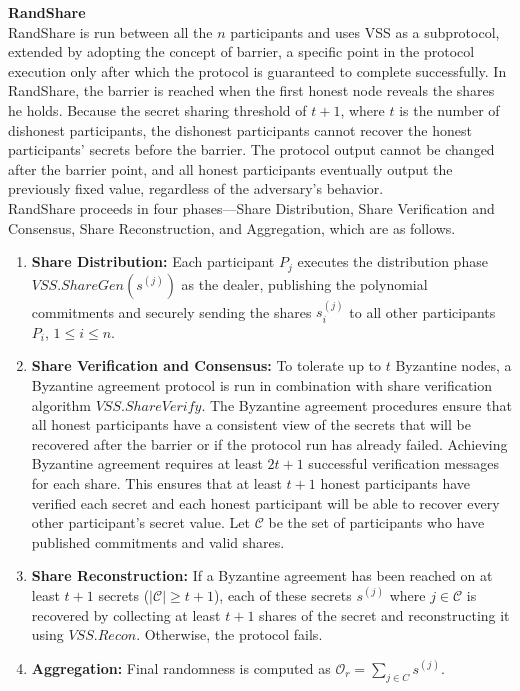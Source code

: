 \documentclass[letterpaper,twocolumn,10pt]{article}
\theoremstyle{definition}
\theoremstyle{remark}
\begin{document}
\textbf{RandShare}\\

RandShare is run between all the $n$ participants and uses VSS as a subprotocol, extended by adopting the concept of barrier, a specific point in the protocol execution only after which the protocol is guaranteed to complete successfully. In RandShare, the barrier is reached when the first honest node reveals the shares he holds. Because the secret sharing threshold of $t + 1$, where $t$ is the number of dishonest participants, the dishonest participants cannot recover the honest participants’ secrets before the barrier. The protocol output cannot be changed after the barrier point, and all honest participants eventually output the previously fixed value, regardless of the adversary’s behavior.\\
RandShare proceeds in four phases---Share Distribution, Share Verification and Consensus, Share Reconstruction, and Aggregation, which are as follows.

\begin{enumerate}
    \item \textbf{Share Distribution:} Each participant $P_j$ executes the distribution phase $VSS.ShareGen(s^{(j)})$ as the dealer, publishing the polynomial commitments and securely sending the shares $s_i^{(j)}$ to all other participants $P_i$, $1\le i\le n$.
    \item \textbf{Share Verification and Consensus:} To tolerate up to $t$ Byzantine nodes, a Byzantine agreement protocol is run in combination with share verification algorithm $VSS.ShareVerify$. The Byzantine agreement procedures ensure that all honest participants have a consistent view of the secrets that will be recovered after the barrier or if the protocol run has already failed. Achieving Byzantine agreement requires at least $2t+1$ successful verification messages for each share. This ensures that at least $t+1$ honest participants have verified each secret and each honest participant will be able to recover every other participant’s secret value. Let $\mathcal{C}$ be the set of participants who have published commitments and valid shares. 
    \item \textbf{Share Reconstruction:} If a Byzantine agreement has been reached on at least $t+1$ secrets ($|\mathcal{C}| \ge t+1$), each of these secrets $s^{(j)}$ where $j \in \mathcal{C}$ is recovered by collecting at least $t+1$ shares of the secret and reconstructing it using $VSS.Recon$. Otherwise, the protocol fails.
    \item \textbf{Aggregation:} Final randomness is computed as $\mathcal{O}_r = \sum_{j \in C}s^{(j)}$.
    
\end{enumerate}
\end{document}
